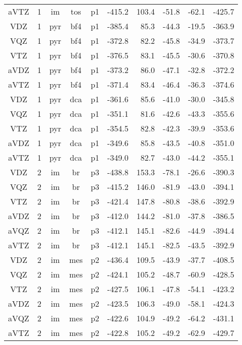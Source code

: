 \documentclass[a4paper]{article}
\begin{document}
\begin{table}[ht]
\begin{tabular}{cccccrrrrr}
  aVTZ &  1 & im & tos & p1 & -415.2 & 103.4 & -51.8 & -62.1 & -425.7 \\ 
  VDZ &  1 & pyr & bf4 & p1 & -385.4 & 85.3 & -44.3 & -19.5 & -363.9 \\ 
  VQZ &  1 & pyr & bf4 & p1 & -372.8 & 82.2 & -45.8 & -34.9 & -373.7 \\ 
  VTZ &  1 & pyr & bf4 & p1 & -376.5 & 83.1 & -45.5 & -30.6 & -370.8 \\ 
  aVDZ &  1 & pyr & bf4 & p1 & -373.2 & 86.0 & -47.1 & -32.8 & -372.2 \\ 
  aVTZ &  1 & pyr & bf4 & p1 & -371.4 & 83.4 & -46.4 & -36.3 & -374.6 \\ 
  VDZ &  1 & pyr & dca & p1 & -361.6 & 85.6 & -41.0 & -30.0 & -345.8 \\ 
  VQZ &  1 & pyr & dca & p1 & -351.1 & 81.6 & -42.6 & -43.3 & -355.6 \\ 
  VTZ &  1 & pyr & dca & p1 & -354.5 & 82.8 & -42.3 & -39.9 & -353.6 \\ 
  aVDZ &  1 & pyr & dca & p1 & -349.6 & 85.8 & -43.5 & -40.8 & -351.0 \\ 
  aVTZ &  1 & pyr & dca & p1 & -349.0 & 82.7 & -43.0 & -44.2 & -355.1 \\ 
  VDZ &  2 & im & br & p3 & -438.8 & 153.3 & -78.1 & -26.6 & -390.3 \\ 
  VQZ &  2 & im & br & p3 & -415.2 & 146.0 & -81.9 & -43.0 & -394.1 \\ 
  VTZ &  2 & im & br & p3 & -421.4 & 147.8 & -80.8 & -38.6 & -392.9 \\ 
  aVDZ &  2 & im & br & p3 & -412.0 & 144.2 & -81.0 & -37.8 & -386.5 \\ 
  aVQZ &  2 & im & br & p3 & -412.1 & 145.1 & -82.6 & -44.9 & -394.4 \\ 
  aVTZ &  2 & im & br & p3 & -412.1 & 145.1 & -82.5 & -43.5 & -392.9 \\ 
  VDZ &  2 & im & mes & p2 & -436.4 & 109.5 & -43.9 & -37.7 & -408.5 \\ 
  VQZ &  2 & im & mes & p2 & -424.1 & 105.2 & -48.7 & -60.9 & -428.5 \\ 
  VTZ &  2 & im & mes & p2 & -427.5 & 106.1 & -47.8 & -54.1 & -423.2 \\ 
  aVDZ &  2 & im & mes & p2 & -423.5 & 106.3 & -49.0 & -58.1 & -424.3 \\ 
  aVQZ &  2 & im & mes & p2 & -422.6 & 104.9 & -49.2 & -64.2 & -431.1 \\ 
  aVTZ &  2 & im & mes & p2 & -422.8 & 105.2 & -49.2 & -62.9 & -429.7 \\ 

\end{tabular}
\end{table}
\end{document}
